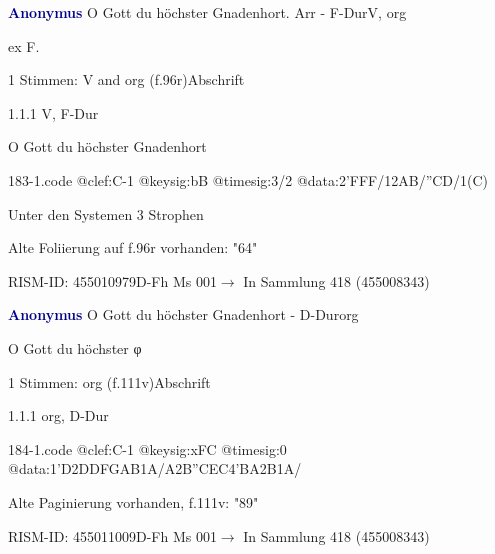 \documentclass[twocolumn]{book}
\begin{document}
\par \vspace{7pt} \textcolor{darkblue}{\textbf{Anonymus  }}\hfillplus{\textbf{[183]}}\newline O Gott du höchster Gnadenhort. Arr - F-Dur\newline V, org
\par \begin{itshape}[f.96r, at left:] ex F.\end{itshape} 
\par \textcolor{darkblue}{}  1 Stimmen: V and org  (f.96r)\newline Abschrift
\par 1.1.1  V, F-Dur\newline \begin{footnotesize} O Gott du höchster Gnadenhort \end{footnotesize}  
\begin{filecontents*}{183-1.code}
@clef:C-1
@keysig:bB
@timesig:3/2
@data:2'FFF/12AB/''CD/1(C)
\end{filecontents*}
\newline
%
\par Unter den Systemen 3 Strophen
\par Alte Foliierung auf f.96r vorhanden: "64"
\par RISM-ID: 455010979\newline D-Fh  Ms 001\newline $\rightarrow$ In Sammlung 418 (455008343)
      
\par \vspace{7pt} \textcolor{darkblue}{\textbf{Anonymus  }}\hfillplus{\textbf{[184]}}\newline O Gott du höchster Gnadenhort - D-Dur\newline org
\par \begin{itshape}[f.111v, heading:] O Gott du höchster φ\end{itshape} 
\par \textcolor{darkblue}{}  1 Stimmen: org  (f.111v)\newline Abschrift
\par 1.1.1  org, D-Dur  
\begin{filecontents*}{184-1.code}
@clef:C-1
@keysig:xFC
@timesig:0
@data:1'D2DDFGAB1A/A2B''CEC4'BA2B1A/
\end{filecontents*}
\newline
%
\par Alte Paginierung vorhanden, f.111v: "89"
\par RISM-ID: 455011009\newline D-Fh  Ms 001\newline $\rightarrow$ In Sammlung 418 (455008343)
      
\end{document}
